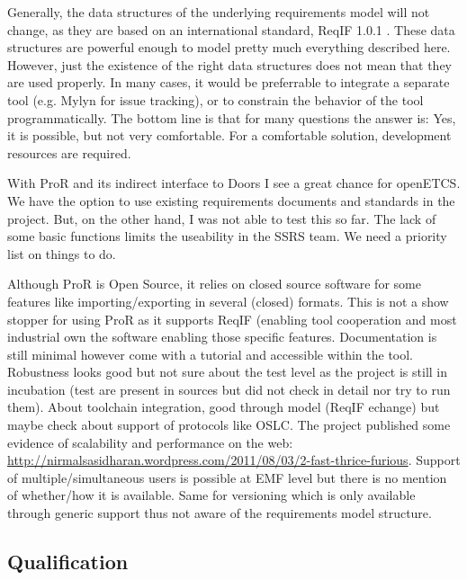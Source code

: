 \begin{author_comment}
Generally, the data structures of the underlying requirements model will not change, as they are based on an international standard, ReqIF 1.0.1 \cite{omg_requirements_2011}.  These data structures are powerful enough to model pretty much everything described here.  However, just the existence of the right data structures does not mean that they are used properly.  In many cases, it would be preferrable to integrate a separate tool (e.g. Mylyn for issue tracking), or to constrain the behavior of the tool programmatically.  The bottom line is that for many questions the answer is: Yes, it is possible, but not very comfortable.  For a comfortable solution, development resources are required.
\end{author_comment}

\begin{assessor1}
With ProR and its indirect interface to Doors I see a great chance for openETCS. We have the option to use existing requirements documents and standards in the project. But, on the other hand, I was not able to test this so far. The lack of some basic functions limits the useability in the SSRS team. We need a priority list on things to do.
\end{assessor1}

\begin{assessor2}
Although ProR is Open Source, it relies on closed source software for some features like importing/exporting in several (closed) formats. This is not a show stopper for using ProR as it supports ReqIF (enabling tool cooperation and most industrial own the software enabling those specific features. Documentation is still minimal however come with a tutorial and accessible within the tool. Robustness looks good but not sure about the test level as the project is still in incubation (test are present in sources but did not check in detail nor try to run them). About toolchain integration, good through model (ReqIF echange) but maybe check about support of protocols like OSLC. The project published some evidence of scalability and performance on the web: \url{http://nirmalsasidharan.wordpress.com/2011/08/03/2-fast-thrice-furious}. Support of multiple/simultaneous users is possible at EMF level but there is no mention of whether/how it is available. Same for versioning which is only available through generic support thus not aware of the requirements model structure.
\end{assessor2}

\subsection{Qualification}

